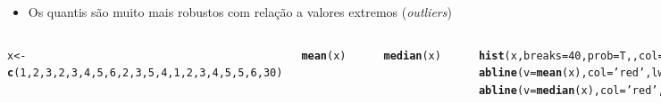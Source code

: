 \documentclass{beamer}\usepackage[]{graphicx}\usepackage[]{color}
\makeatletter
\newcommand{\hlnum}[1]{\textcolor[rgb]{0.686,0.059,0.569}{#1}}%
\newcommand{\hlstr}[1]{\textcolor[rgb]{0.192,0.494,0.8}{#1}}%
\newcommand{\hlstd}[1]{\textcolor[rgb]{0.345,0.345,0.345}{#1}}%
\newcommand{\hlkwb}[1]{\textcolor[rgb]{0.69,0.353,0.396}{#1}}%
\newcommand{\hlkwc}[1]{\textcolor[rgb]{0.333,0.667,0.333}{#1}}%
\newcommand{\hlkwd}[1]{\textcolor[rgb]{0.737,0.353,0.396}{\textbf{#1}}}%
\newenvironment{kframe}{%
 \def\at@end@of@kframe{}%
 \ifinner\ifhmode%
  \def\at@end@of@kframe{\end{minipage}}%
  \begin{minipage}{\columnwidth}%
 \fi\fi%
 \def\FrameCommand##1{\hskip\@totalleftmargin \hskip-\fboxsep
 \colorbox{shadecolor}{##1}\hskip-\fboxsep
     \hskip-\linewidth \hskip-\@totalleftmargin \hskip\columnwidth}%
 \MakeFramed {\advance\hsize-\width
   \@totalleftmargin\z@ \linewidth\hsize
   \@setminipage}}%
 {\par\unskip\endMakeFramed%
 \at@end@of@kframe}
\newenvironment{knitrout}{}{} %
\renewenvironment{knitrout}{\setlength{\topsep}{0mm}}{}
\makeatother
\begin{document}
\begin{frame}[fragile]%

\begin{itemize}
  \item Os quantis são muito mais robustos com relação a valores extremos (\emph{outliers})
\end{itemize}
\begin{columns}[c]


\begin{knitrout}\tiny
{}\color{fgcolor}\begin{kframe}
\begin{alltt}
\hlstd{x} \hlkwb{<-} \hlkwd{c}\hlstd{(}\hlnum{1}\hlstd{,}\hlnum{2}\hlstd{,}\hlnum{3}\hlstd{,}\hlnum{2}\hlstd{,}\hlnum{3}\hlstd{,}\hlnum{4}\hlstd{,}\hlnum{5}\hlstd{,}\hlnum{6}\hlstd{,}\hlnum{2}\hlstd{,}\hlnum{3}\hlstd{,}\hlnum{5}\hlstd{,}\hlnum{4}\hlstd{,}\hlnum{1}\hlstd{,}\hlnum{2}\hlstd{,}\hlnum{3}\hlstd{,}\hlnum{4}\hlstd{,}\hlnum{5}\hlstd{,}\hlnum{5}\hlstd{,}\hlnum{6}\hlstd{,}\hlnum{30}\hlstd{)}

\hlkwd{mean}\hlstd{(x)}
\end{alltt}
\begin{verbatim}
## [1] 4.8
\end{verbatim}
\begin{alltt}
\hlkwd{median}\hlstd{(x)}
\end{alltt}
\begin{verbatim}
## [1] 3.5
\end{verbatim}
\begin{alltt}
\hlkwd{hist}\hlstd{(x,}\hlkwc{breaks}\hlstd{=}\hlnum{40}\hlstd{,}\hlkwc{prob}\hlstd{=T,,}\hlkwc{col}\hlstd{=}\hlstr{'gray70'}\hlstd{)}
\hlkwd{abline}\hlstd{(}\hlkwc{v}\hlstd{=}\hlkwd{mean}\hlstd{(x),}\hlkwc{col}\hlstd{=}\hlstr{'red'}\hlstd{,}\hlkwc{lwd}\hlstd{=}\hlnum{2}\hlstd{,}\hlkwc{lty}\hlstd{=}\hlnum{1}\hlstd{)}
\hlkwd{abline}\hlstd{(}\hlkwc{v}\hlstd{=}\hlkwd{median}\hlstd{(x),}\hlkwc{col}\hlstd{=}\hlstr{'red'}\hlstd{,}\hlkwc{lwd}\hlstd{=}\hlnum{2}\hlstd{,}\hlkwc{lty}\hlstd{=}\hlnum{2}\hlstd{)}
\end{alltt}
\end{kframe}
\end{knitrout}


\end{columns}
\end{frame}
\end{document}
